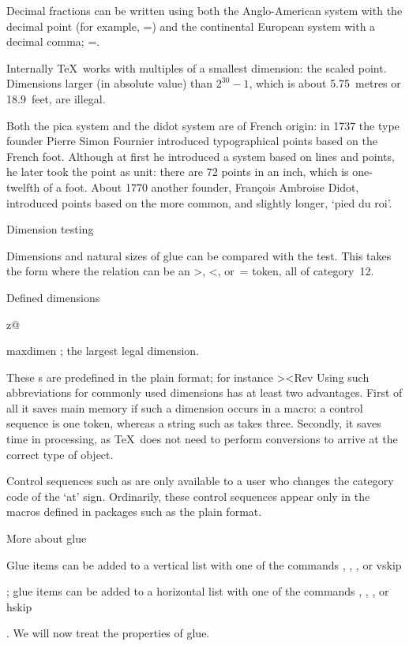 Decimal fractions can be written using both the
Anglo-American system with the decimal point
(for example, \n{1in}=\n{72.27pt})
and the continental European system with a decimal
comma; \n{1in}=.

Internally \TeX\ works with multiples of a smallest 
dimension: the  scaled point.
Dimensions larger (in absolute value) than $2^{30}-1$,
which is about 5.75~metres or 18.9~feet, are illegal.

Both the pica system and the didot system are of French
origin: in 1737 the type founder Pierre Simon Fournier
introduced typographical points based on the French foot.
Although at first he introduced a system based on lines and
points, he later took the point as unit:
there are 72 points in an inch,
which is one-twelfth of a foot. 
About 1770 another founder, Fran\c{c}ois Ambroise Didot, introduced
points based on the more common, and slightly longer,
`pied du roi'.

\spoint Dimension testing

Dimensions and natural sizes of glue can be compared with
the  test. This takes the form
\disp{}\dispstop
where the relation can be an \n>, \n<, or~\n= token, 
all of category~12.

\spoint Defined dimensions

\invent
\item z@
 \n{0pt}

\item maxdimen 
      \n{16383.99999pt}; the largest legal dimension.

\>
These s are predefined in the plain format;
for instance \Ver>\newdimen\z@ \z@=0pt<Rev
Using such abbreviations for commonly used dimensions
has at least two advantages. First of all it saves main memory
if such a dimension occurs in a macro: a control sequence
is one token, whereas a string such as \n{0pt} takes three.
Secondly, it saves time in processing, as \TeX\ does not need
to perform conversions to arrive at the correct type of
object.

Control sequences such as 
are only available to a user who changes the
category code of the `at' sign. Ordinarily, these control sequences
appear only in the macros defined in packages such as the
plain format.

\point More about glue

Glue items can be added to a vertical list with one of the
\alt
commands , , ,  or
\csterm vskip\par
{}; 
glue items can be added to a horizontal list with one of the
commands , , ,  or
\csterm hskip\par
{}. We will now treat the properties of glue.

